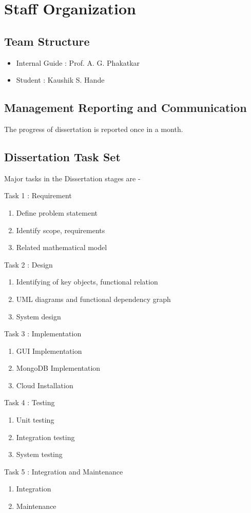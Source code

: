 \documentclass[oneside,a4paper,12pt]{pictreport}
\begin{document}
\section{Staff Organization}

\subsection{Team Structure}
\begin{itemize}
    \item Internal Guide : Prof. A. G. Phakatkar
    \item Student : Kaushik S. Hande 
\end{itemize}

\subsection{Management Reporting and Communication}
The progress of dissertation is reported once in a month.
\subsection{Dissertation Task Set}


Major tasks in the Dissertation stages are - 
	
				
				Task 1 : Requirement
					\begin{enumerate}
						\item Define problem statement
						\item Identify scope, requirements
						\item Related mathematical model
					\end{enumerate}
				Task 2 : Design
					\begin{enumerate}
						\item Identifying of key objects, functional relation
						\item UML diagrams and functional dependency graph
						\item System design
					\end{enumerate}
				Task 3 : Implementation
				\begin{enumerate}
						\item GUI Implementation
						\item MongoDB Implementation
						\item Cloud Installation
					\end{enumerate}
				Task 4 : Testing
					\begin{enumerate}
						\item Unit testing
						\item Integration testing
						\item System testing
					\end{enumerate}
				Task 5 : Integration and Maintenance
					\begin{enumerate}
						\item Integration
						\item Maintenance
					\end{enumerate}
\end{document}
